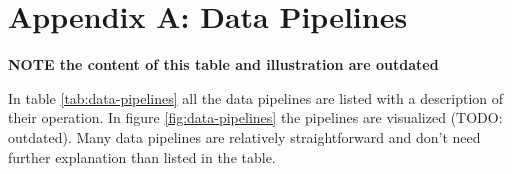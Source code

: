 \clearpage

\appendix

\section{Appendix A: Data Pipelines}
\label{sec:appendix-a-data-pipelines}

\textbf{NOTE the content of this table and illustration are outdated}

In table \ref{tab:data-pipelines} all the data pipelines are listed with a description of their operation. In figure \ref{fig:data-pipelines} the pipelines are visualized (TODO: outdated). Many data pipelines are relatively straightforward and don't need further explanation than listed in the table.

